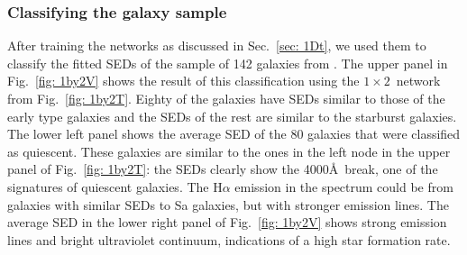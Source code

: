         \subsubsection{Classifying the galaxy sample}
         \label{sec: 1Dv}
            After training the networks as discussed in Sec.~\ref{sec: 1Dt}, we used them to classify the fitted SEDs of the sample of 142 galaxies from .
            The upper panel in Fig.~\ref{fig: 1by2V} shows the result of this classification using the $1\times2$~network from Fig.~\ref{fig: 1by2T}.
            Eighty of the galaxies have SEDs similar to those of the early type galaxies and the SEDs of the rest are similar to the starburst galaxies.
            The lower left panel shows the average SED of the 80 galaxies that were classified as quiescent. 
            These galaxies are similar to the ones in the left node in the upper panel of Fig.~\ref{fig: 1by2T}:
            the SEDs clearly show the 4000\AA~break, one of the signatures of quiescent galaxies.
            The H$\alpha$ emission in the spectrum could be from galaxies with similar SEDs to Sa galaxies, but with stronger emission lines.
            The average SED in the lower right panel of Fig.~\ref{fig: 1by2V} shows strong emission lines and bright ultraviolet continuum, indications of a high star formation rate.
